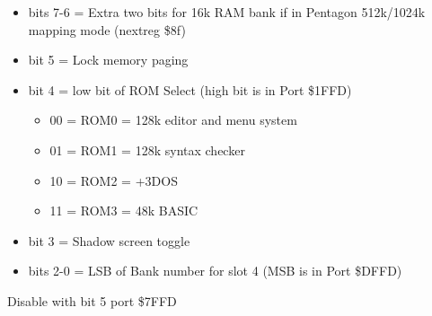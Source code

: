 \begin{itemize}
\item[] bits 7-6 = Extra two bits for 16k RAM bank if in Pentagon 512k/1024k
        mapping mode (nextreg \$8f)
\item[] bit 5 = Lock memory paging
\item[] bit 4 = low bit of ROM Select (high bit is in Port \$1FFD) 
  \begin{itemize} \item[] 00 = ROM0 = 128k editor and menu
  system \item[] 01 = ROM1 = 128k syntax checker \item[] 10 = ROM2 =
  +3DOS \item[] 11 = ROM3 = 48k BASIC \end{itemize}
\item[] bit 3 = Shadow screen toggle
\item[] bits 2-0 = LSB of Bank number for slot 4 (MSB is in Port \$DFFD)
\end{itemize}
Disable with bit 5 port \$7FFD

